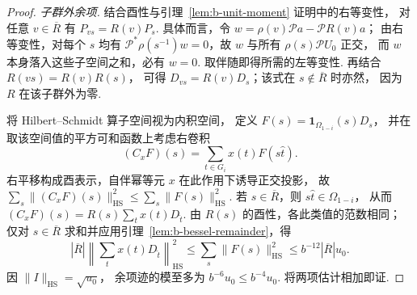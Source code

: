 \begin{proof}
\emph{子群外余项.}
结合酉性与引理~\ref{lem:b-unit-moment} 证明中的右等变性，
对任意 $v\in\overline R$ 有 $P_{vs}=R(v)P_s$.
具体而言，令 $w=\rho(v)\mathcal P a-\mathcal P R(v)a$；
由右等变性，对每个 $s$ 均有
$\mathcal P^*\rho(s^{-1})w=0$，故 $w$ 与所有 $\rho(s)\mathcal P U_0$ 正交，
而 $w$ 本身落入这些子空间之和，必有 $w=0$.
取伴随即得所需的左等变性. 再结合 $R(vs)=R(v)R(s)$，
可得 $D_{vs}=R(v)D_s$；该式在 $s\notin\overline R$ 时亦然，
因为 $R$ 在该子群外为零.

将 Hilbert--Schmidt 算子空间视为内积空间，
定义 $F(s)=\mathbf 1_{\Omega_{1-i}}(s)D_s$，
并在取该空间值的平方可和函数上考虑右卷积
\[
 (C_xF)(s)=\sum_{t\in G_i}x(t)F(s\widehat t).
\]
右平移构成酉表示，自伴幂等元 $x$ 在此作用下诱导正交投影，
故 $\sum_s\|(C_xF)(s)\|_{\mathrm{HS}}^2\le\sum_s\|F(s)\|_{\mathrm{HS}}^2$.
若 $s\in\overline R$，则 $s\widehat t\in\Omega_{1-i}$，
从而 $(C_xF)(s)=R(s)\sum_t x(t)D_{\widehat t}$.
由 $R(s)$ 的酉性，各此类值的范数相同；
仅对 $s\in\overline R$ 求和并应用引理~\ref{lem:b-bessel-remainder}，得
\[
 |\overline R|\left\|\sum_t x(t)D_{\widehat t}\right\|_{\mathrm{HS}}^2
 \le \sum_s\|F(s)\|_{\mathrm{HS}}^2
 \le b^{-12}|\overline R|u_0 .
\]
因 $\|I\|_{\mathrm{HS}}=\sqrt{u_0}$，
余项迹的模至多为 $b^{-6}u_0\le b^{-4}u_0$.
将两项估计相加即证.
\end{proof}

